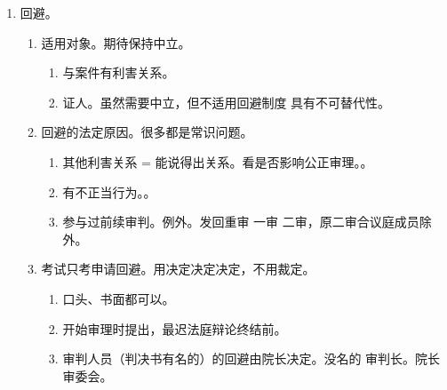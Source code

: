\begin{enumerate}
\begin{enumerate}
\begin{kk}{二审独任制度。新增}
\begin{enumerate}
                    \item 发现独任不适合的，应裁定转为合议庭审理。
                    \item 提异议的。\yi 成立 \yjt 转为合议庭。\er 不成立 \yjt 驳回。
                  \end{enumerate}
                \end{kk}
          \item 再审。合议庭组成具体看几审。\yi 一审 \yjt 一审。\er 二审、提审 \yjt 二审。。
          \item 特别程序。\yi 原则独任制。\er 选民资格、重大疑难案件 \yjt 合议制。
          \item 督促程序/支付令。独任制。
          \item 公示催告程序。公示催告阶段 \yjt 独任制。除权判决阶段 \yjt 合议制。
        \end{enumerate}
  \item 回避。
        \begin{enumerate}
          \item 适用对象。期待保持中立。
                \begin{enumerate}
                  \item 与案件有利害关系。
                  \item 证人。虽然需要中立，但不适用回避制度 \yjt 具有不可替代性。
                \end{enumerate}
          \item 回避的法定原因。很多都是常识问题。
                \begin{enumerate}
                  \item 其他利害关系 = 能说得出关系。看是否影响公正审理。。
                  \item 有不正当行为。。
                  \item 参与过前续审判。例外。发回重审 \yjt 一审 \yjt 二审，原二审合议庭成员除外。
                \end{enumerate}
          \item 考试只考申请回避。用决定决定决定，不用裁定。
                \begin{enumerate}
                  \item 口头、书面都可以。
                  \item 开始审理时提出，最迟法庭辩论终结前。
                  \item 审判人员（判决书有名的）的回避由院长决定。没名的 \yjt 审判长。院长 \yjt 审委会。

\end{enumerate}
\end{enumerate}
\end{enumerate}
